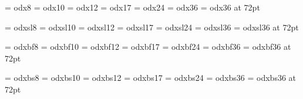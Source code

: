 \def\odssbsVIII{\odssbs@VIII\baselineskip=9pt}
\def\odssbs{\odssbs@X\baselineskip=12pt}
\def\odssbsXII{\odssbs@XII\baselineskip=15pt}
\def\odssbsXVII{\odssbs@XVII\baselineskip=20pt}
\def\odssbsXXIV{\odssbs@XXIV\baselineskip=26pt}
\def\odssbsXXXVI{\odssbs@XXXVI\baselineskip=36pt}
\def\odssbsLXXII{\odssbs@LXXII\baselineskip=72pt}




\font\odx@VIII     = odx8
\font\odx@X        = odx10
\font\odx@XII      = odx12
\font\odx@XVII     = odx17
\font\odx@XXIV     = odx24
\font\odx@XXXVI    = odx36
\font\odx@LXXII    = odx36 at 72pt

\font\odsxl@VIII   = odxsl8
\font\odxsl@X      = odxsl10
\font\odxsl@XII    = odxsl12
\font\odxsl@XVII   = odxsl17
\font\odxsl@XXIV   = odxsl24
\font\odxsl@XXXVI  = odxsl36
\font\odxsl@LXXII  = odxsl36 at 72pt

\font\odxbf@VIII   = odxbf8
\font\odxbf@X      = odxbf10
\font\odxbf@XII    = odxbf12
\font\odxbf@XVII   = odxbf17
\font\odxbf@XXIV   = odxbf24
\font\odxbf@XXXVI  = odxbf36
\font\odxbf@LXXII  = odxbf36 at 72pt

\font\odxbs@VIII   = odxbs8
\font\odxbs@X      = odxbs10
\font\odxbs@XII    = odxbs12
\font\odxbs@XVII   = odxbs17
\font\odxbs@XXIV   = odxbs24
\font\odxbs@XXXVI  = odxbs36
\font\odxbs@LXXII  = odxbs36 at 72pt

\def\odxVIII{\odx@VIII\baselineskip=9pt}
\def\odx{\odx@X\baselineskip=12pt}
\def\odxXII{\odx@XII\baselineskip=15pt}
\def\odxXVII{\odx@XVII\baselineskip=20pt}
\def\odxXXIV{\odx@XXIV\baselineskip=26pt}
\def\odxXXXVI{\odx@XXXVI\baselineskip=36pt}
\def\odxLXXII{\odx@LXXII\baselineskip=72pt}

\def\odxslVIII{\odxsl@VIII\baselineskip=9pt}
\def\odxsl{\odxsl@X\baselineskip=12pt}
\def\odxslXII{\odxsl@XII\baselineskip=15pt}
\def\odxslXVII{\odxsl@XVII\baselineskip=20pt}
\def\odxslXXIV{\odxsl@XXIV\baselineskip=26pt}
\def\odxslXXXVI{\odxsl@XXXVI\baselineskip=36pt}
\def\odxslLXXII{\odxsl@LXXII\baselineskip=72pt}

\def\odxbfVIII{\odxbf@VIII\baselineskip=9pt}
\def\odxbf{\odxbf@X\baselineskip=12pt}
\def\odxbfXII{\odxbf@XII\baselineskip=15pt}
\def\odxbfXVII{\odxbf@XVII\baselineskip=20pt}
\def\odxbfXXIV{\odxbf@XXIV\baselineskip=26pt}
\def\odxbfXXXVI{\odxbf@XXXVI\baselineskip=36pt}
\def\odxbfLXXII{\odxbf@LXXII\baselineskip=72pt}

